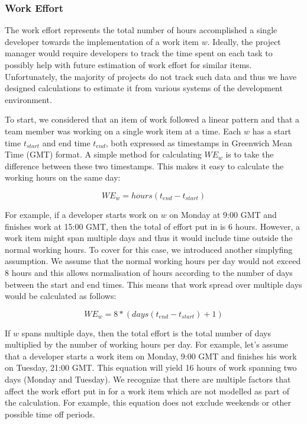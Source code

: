 \documentclass{mpaper}
\begin{document}
\subsubsection*{Work Effort}
\label{work-effort}

The work effort represents the total number of hours accomplished a single
developer towards the implementation of a work item $w$. Ideally, the project
manager would require developers to track the time spent on each task to
possibly help with future estimation of work effort for similar items.
Unfortunately, the majority of projects do not track such data and thus we have
designed calculations to estimate it from various systems of the development
environment.

To start, we considered that an item of work followed a linear pattern and that
a team member was working on a single work item at a time. Each $w$ has a start
time $t_{start}$ and end time $t_{end}$, both expressed as timestamps in
Greenwich Mean Time (GMT) format. A simple method for calculating $WE_{w}$ is to
take the difference between these two timestamps. This makes it easy to
calculate the working hours on the same day:

\begin{equation}
  \label{eq-work-effort-simple}
  WE_{w} = hours(t_{end} - t_{start})
\end{equation}

For example, if a developer starts work on $w$ on Monday at 9:00 GMT and
finishes work at 15:00 GMT, then the total of effort put in is 6 hours. However,
a work item might span multiple days and thus it would include time outside the
normal working hours. To cover for this case, we introduced another simplyfing
assumption. We assume that the normal working hours per day would not exceed 8
hours and this allows normalisation of hours according to the number of days
between the start and end times. This means that work spread over multiple days
would be calculated as follows:

\begin{equation}
  \label{eq-work-effort-days}
  WE_{w} = 8 * (days(t_{end} - t_{start}) + 1)
\end{equation}

If $w$ spans multiple days, then the total effort is the total number of
days multiplied by the number of working hours per day. For example, let's
assume that a developer starts a work item on Monday, 9:00 GMT and finishes his
work on Tuesday, 21:00 GMT. This equation will yield 16 hours of work spanning
two days (Monday and Tuesday). We recognize that there are multiple factors that
affect the work effort put in for a work item which are not modelled as part of
the calculation. For example, this equation does not exclude weekends or other
possible time off periods. 
\end{document}
